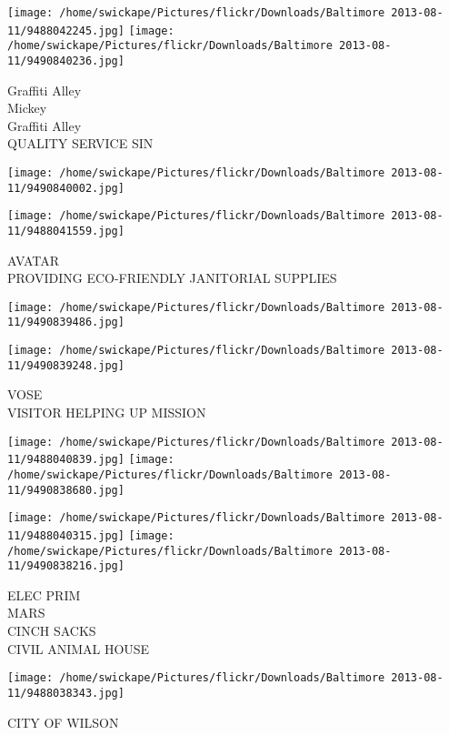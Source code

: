 \documentclass[10pt,letterpaper]{article}
\begin{document}
\texttt{[image: /home/swickape/Pictures/flickr/Downloads/Baltimore 2013-08-11/9488042245.jpg]}
\texttt{[image: /home/swickape/Pictures/flickr/Downloads/Baltimore 2013-08-11/9490840236.jpg]}

Graffiti Alley\\
Mickey\\
Graffiti Alley\\
QUALITY SERVICE SIN\\
\pagebreak

\texttt{[image: /home/swickape/Pictures/flickr/Downloads/Baltimore 2013-08-11/9490840002.jpg]}

\vspace{0.25in}
\texttt{[image: /home/swickape/Pictures/flickr/Downloads/Baltimore 2013-08-11/9488041559.jpg]}

AVATAR\\
PROVIDING ECO{-}FRIENDLY JANITORIAL SUPPLIES\\
\pagebreak

\texttt{[image: /home/swickape/Pictures/flickr/Downloads/Baltimore 2013-08-11/9490839486.jpg]}

\vspace{0.25in}
\texttt{[image: /home/swickape/Pictures/flickr/Downloads/Baltimore 2013-08-11/9490839248.jpg]}

VOSE\\
VISITOR HELPING UP MISSION\\
\pagebreak

\texttt{[image: /home/swickape/Pictures/flickr/Downloads/Baltimore 2013-08-11/9488040839.jpg]}
\texttt{[image: /home/swickape/Pictures/flickr/Downloads/Baltimore 2013-08-11/9490838680.jpg]}

\texttt{[image: /home/swickape/Pictures/flickr/Downloads/Baltimore 2013-08-11/9488040315.jpg]}
\texttt{[image: /home/swickape/Pictures/flickr/Downloads/Baltimore 2013-08-11/9490838216.jpg]}

ELEC PRIM\\
MARS\\
CINCH SACKS\\
CIVIL ANIMAL HOUSE\\
\pagebreak

\texttt{[image: /home/swickape/Pictures/flickr/Downloads/Baltimore 2013-08-11/9488038343.jpg]}

CITY OF WILSON\\
\pagebreak
\end{document}
